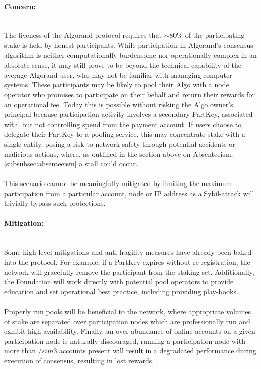 \documentclass[11pt,a4paper]{article}
\begin{document}
\paragraph{Concern:} \mbox{}\\
The liveness of the Algorand protocol requires that $\sim$80\% of the participating stake is held by honest 
participants. While participation in Algorand's consensus algorithm is neither computationally burdensome nor 
operationally complex in an absolute sense, it may still prove to be beyond the technical capability of the average 
Algorand user, who may not be familiar with managing computer systems. These participants may be likely to pool their 
Algo with a node operator who promises to participate on their behalf and return their rewards for an operational fee. 
Today this is possible without risking the Algo owner’s principal because participation activity involves a secondary 
\gls{PartKey}, associated with, but not controlling spend from the payment account. If users choose to delegate their 
\gls{PartKey} to a pooling service, this may concentrate stake with a single entity, posing a risk to network safety 
through potential accidents or malicious actions, where, as outlined in the section above on Absenteeism, 
\ref{subsubsec:absenteeism} a stall could occur. \\ \\

This scenario cannot be meaningfully mitigated by limiting the maximum participation from a particular account, 
node or IP address as a Sybil-attack will trivially bypass such protections.

\paragraph{Mitigation:} \mbox{}\\
Some high-level mitigations and anti-fragility measures have already been baked into the protocol. For example, if a
\gls{PartKey} expires without re-registration, the network will gracefully remove the participant from the staking set.
Additionally, the Foundation will work directly with potential pool operators to provide education and set operational
best practice, including providing play-books. \\ \\
Properly run pools will be beneficial to the network, where appropriate volumes of stake are separated over
participation nodes which are professionally run and exhibit high-availability. Finally, an over-abundance of online 
accounts on a given participation node is naturally discouraged, running a participation node with more than $/sim$3 
accounts present will result in a degradated performance during execution of consensus, resulting in lost rewards.
\end{document}
